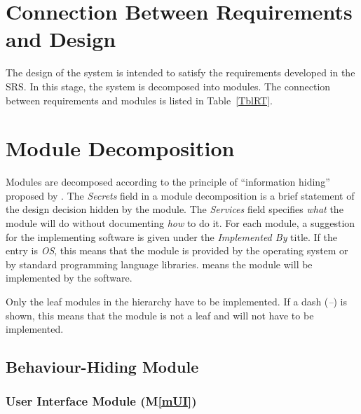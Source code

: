 \documentclass[12pt, titlepage]{article}
\newcommand{\mref}[1]{M\ref{#1}}
\begin{document}
\section{Connection Between Requirements and Design} \label{SecConnection}

The design of the system is intended to satisfy the requirements developed in
the SRS. In this stage, the system is decomposed into modules. The connection
between requirements and modules is listed in Table~\ref{TblRT}.

\section{Module Decomposition} \label{SecMD}

Modules are decomposed according to the principle of ``information hiding''
proposed by \citet{ParnasEtAl1984}. The \emph{Secrets} field in a module
decomposition is a brief statement of the design decision hidden by the
module. The \emph{Services} field specifies \emph{what} the module will do
without documenting \emph{how} to do it. For each module, a suggestion for the
implementing software is given under the \emph{Implemented By} title. If the
entry is \emph{OS}, this means that the module is provided by the operating
system or by standard programming language libraries.  \emph{\progname{}} means the
module will be implemented by the \progname{} software.

Only the leaf modules in the hierarchy have to be implemented. If a dash
(\emph{--}) is shown, this means that the module is not a leaf and will not have
to be implemented.

\subsection{Behaviour-Hiding Module}

\subsubsection{User Interface Module (\mref{mUI})}
\end{document}
